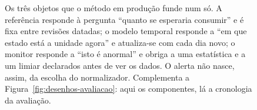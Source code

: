 \begin{figure}[htbp]
  \caption[Referência, estado e monitor como três objetos distintos]%
  {Os três objetos que o método em produção funde num só. A referência
   responde à pergunta ``quanto se esperaria consumir'' e é fixa entre
   revisões datadas; o modelo temporal responde a ``em que estado está a
   unidade agora'' e atualiza-se com cada dia novo; o monitor responde a
   ``isto é anormal'' e obriga a uma estatística e a um limiar declarados
   antes de ver os dados. O alerta não nasce, assim, da escolha do
   normalizador. Complementa a Figura~\ref{fig:desenhos-avaliacao}: aqui
   os componentes, lá a cronologia da avaliação.}
  \label{fig:ref-estado-monitor}
\end{figure}
